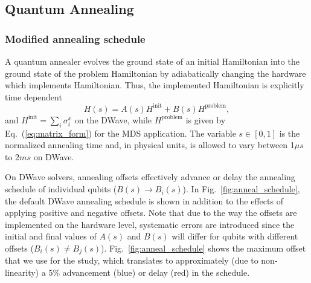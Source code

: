 \documentclass[prd,twocolumn,tightenlines,preprintnumbers,showpacs,superscriptaddress,notitlepage,nofootinbib,eqsecnum,floatfix,longbibliography]{revtex4}
\begin{document}
\subsection{Quantum Annealing}
\label{sec:methods:annealing}

\subsubsection{Modified annealing schedule}
\label{sec:methods:annealing-schedule}

A quantum annealer evolves the ground state of an initial Hamiltonian into the ground state of the problem Hamiltonian by adiabatically changing the hardware which implements Hamiltonian.
Thus, the implemented Hamiltonian is explicitly time dependent
\begin{equation}
    H(s) = A(s) H^{\textrm{init}} + B(s) H^{\textrm{problem}}, \label{eq:tdhamiltonian}
\end{equation}
and $H^\textrm{init}=\sum_i\sigma^x_i$ on the DWave, while $H^\textrm{problem}$ is given by Eq.~(\ref{eq:matrix_form}) for the MDS application.
The variable $s\in [0, 1]$ is the normalized annealing time and, in physical units, is allowed to vary between 1$\mu s$ to 2$ms$ on DWave.

On DWave solvers, annealing offsets effectively advance or delay the annealing schedule of individual qubits ($B(s) \to B_i(s)$).
In Fig.~\ref{fig:anneal_schedule}, the default DWave annealing schedule is shown in addition to the effects of applying positive and negative offsets.
Note that due to the way the offsets are implemented on the hardware level, systematic errors are introduced since the initial and final values of $A(s)$ and $B(s)$ will differ for qubits with different offsets ($B_i(s) \neq B_j(s)$).
Fig.~\ref{fig:anneal_schedule} shows the maximum offset that we use for the study, which translates to approximately (due to non-linearity) a 5\% advancement (blue) or delay (red) in the schedule.
\end{document}
